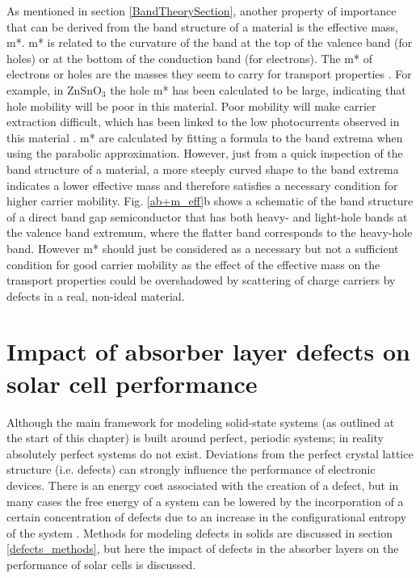 \documentclass[11pt, twoside]{report}
\begin{document}
As mentioned in section \ref{BandTheorySection}, another property of importance that can be derived from the band structure of a material is the effective mass, m*. m* is related to the curvature of the band at the top of the valence band (for holes) or at the bottom of the conduction band (for electrons). The m* of electrons or holes are the masses they seem to carry for transport properties \cite{dielectric_const1}. For example, in ZnSnO$_3$ the hole m* has been calculated to be large, indicating that hole mobility will be poor in this material. Poor mobility will make carrier extraction difficult, which has been linked to the low photocurrents observed in this material \cite{effective_mass1}. m* are calculated by fitting a formula to the band extrema when using the parabolic approximation. However, just from a quick inspection of the band structure of a material, a more steeply curved shape to the band extrema indicates a lower effective mass and therefore satisfies a necessary condition for higher carrier mobility. Fig. \ref{ab+m_eff}b shows a schematic of the band structure of a direct band gap semiconductor that has both heavy- and light-hole bands at the valence band extremum, where the flatter band corresponds to the heavy-hole band.
However m* should just be considered as a necessary but not a sufficient condition for good carrier mobility as the effect of the effective mass on the transport properties could be overshadowed by scattering of charge carriers by defects in a real, non-ideal material. 

\section{Impact of absorber layer defects on solar cell performance}\label{defects_impact}
Although the main framework for modeling solid-state systems (as outlined at the start of this chapter) is built around perfect, periodic systems; in reality absolutely perfect systems do not exist. Deviations from the perfect crystal lattice structure (i.e. defects) can strongly influence the performance of electronic devices. There is an energy cost associated with the creation of a defect, but in many cases the free energy of a system can be lowered by the incorporation of a certain concentration of defects due to an increase in the configurational entropy of the system \cite{AshcroftMermin_general}. Methods for modeling defects in solids are discussed in section \ref{defects_methods}, but here the impact of defects in the absorber layers on the performance of solar cells is discussed.
\end{document}
